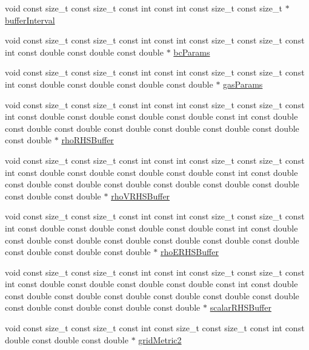 \begin{DoxyCompactItemize}
\item 
void const size\+\_\+t const size\+\_\+t const int const int const size\+\_\+t const size\+\_\+t $\ast$ \hyperlink{WENOKernels_8H_ad1001168d5432b52e6d0636f4dc0e60c}{buffer\+Interval}
\item 
void const size\+\_\+t const size\+\_\+t const int const int const size\+\_\+t const size\+\_\+t const int const double const double const double $\ast$ \hyperlink{WENOKernels_8H_a63e6aad5d271e5b535685e684cb4a11b}{bc\+Params}
\item 
void const size\+\_\+t const size\+\_\+t const int const int const size\+\_\+t const size\+\_\+t const int const double const double const double const double $\ast$ \hyperlink{WENOKernels_8H_a4a903750b21cf9a330a9ec9a41617ff6}{gas\+Params}
\item 
void const size\+\_\+t const size\+\_\+t const int const int const size\+\_\+t const size\+\_\+t const int const double const double const double const double const int const double const double const double const double const double const double const double const double $\ast$ \hyperlink{WENOKernels_8H_ad9842c03322c56f00f61876867bba3c6}{rho\+R\+H\+S\+Buffer}
\item 
void const size\+\_\+t const size\+\_\+t const int const int const size\+\_\+t const size\+\_\+t const int const double const double const double const double const int const double const double const double const double const double const double const double const double const double $\ast$ \hyperlink{WENOKernels_8H_a128c5ac60a5f3c4902dd8fc9df37eb18}{rho\+V\+R\+H\+S\+Buffer}
\item 
void const size\+\_\+t const size\+\_\+t const int const int const size\+\_\+t const size\+\_\+t const int const double const double const double const double const int const double const double const double const double const double const double const double const double const double const double $\ast$ \hyperlink{WENOKernels_8H_aba07a39911c6761f6f6a5b63b9258c39}{rho\+E\+R\+H\+S\+Buffer}
\item 
void const size\+\_\+t const size\+\_\+t const int const int const size\+\_\+t const size\+\_\+t const int const double const double const double const double const int const double const double const double const double const double const double const double const double const double const double const double $\ast$ \hyperlink{WENOKernels_8H_ade287a7a2e34a50a6f0bfb71f1b7995d}{scalar\+R\+H\+S\+Buffer}
\item 
void const size\+\_\+t const size\+\_\+t const int const size\+\_\+t const size\+\_\+t const int const double const double const double $\ast$ \hyperlink{WENOKernels_8H_ad4379232ca7d56ebc603f46f363dca63}{grid\+Metric2}

\end{DoxyCompactItemize}
